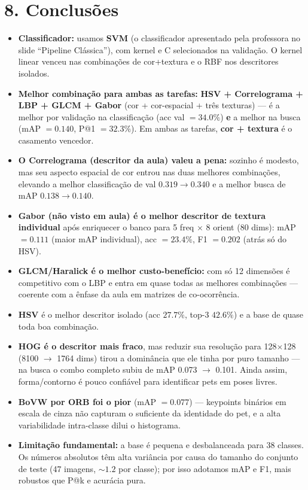 \documentclass[12pt, a4paper]{article}
\begin{document}
\section*{8. Conclusões}
\begin{itemize}
    \item \textbf{Classificador:} usamos \textbf{SVM} (o classificador apresentado pela professora no slide ``Pipeline Clássica''), com kernel e C selecionados na validação. O kernel linear venceu nas combinações de cor+textura e o RBF nos descritores isolados.
    \item \textbf{Melhor combinação para ambas as tarefas:} \textbf{HSV + Correlograma + LBP + GLCM + Gabor} (cor + cor-espacial + três texturas) --- é a melhor por validação na classificação (acc val $= 34.0\%$) \textbf{e} a melhor na busca (mAP $= 0.140$, P@1 $= 32.3\%$). Em ambas as tarefas, \textbf{cor + textura} é o casamento vencedor.
    \item \textbf{O Correlograma (descritor da aula) valeu a pena:} sozinho é modesto, mas seu aspecto espacial de cor entrou nas duas melhores combinações, elevando a melhor classificação de val $0.319 \to 0.340$ e a melhor busca de mAP $0.138 \to 0.140$.
    \item \textbf{Gabor (não visto em aula) é o melhor descritor de textura individual} após enriquecer o banco para 5 freq $\times$ 8 orient (80 dims): mAP $= 0.111$ (maior mAP individual), acc $= 23.4\%$, F1 $= 0.202$ (atrás só do HSV).
    \item \textbf{GLCM/Haralick é o melhor custo-benefício:} com só 12 dimensões é competitivo com o LBP e entra em quase todas as melhores combinações --- coerente com a ênfase da aula em matrizes de co-ocorrência.
    \item \textbf{HSV} é o melhor descritor isolado (acc $27.7\%$, top-3 $42.6\%$) e a base de quase toda boa combinação.
    \item \textbf{HOG é o descritor mais fraco}, mas reduzir sua resolução para 128$\times$128 (8100 $\to$ 1764 dims) tirou a dominância que ele tinha por puro tamanho --- na busca o combo completo subiu de mAP 0.073 $\to$ 0.101. Ainda assim, forma/contorno é pouco confiável para identificar pets em poses livres.
    \item \textbf{BoVW por ORB foi o pior} (mAP $= 0.077$) --- keypoints binários em escala de cinza não capturam o suficiente da identidade do pet, e a alta variabilidade intra-classe dilui o histograma.
    \item \textbf{Limitação fundamental:} a base é pequena e desbalanceada para 38 classes. Os números absolutos têm alta variância por causa do tamanho do conjunto de teste (47 imagens, $\sim 1.2$ por classe); por isso adotamos mAP e F1, mais robustos que P@k e acurácia pura.
\end{itemize}
\end{document}
